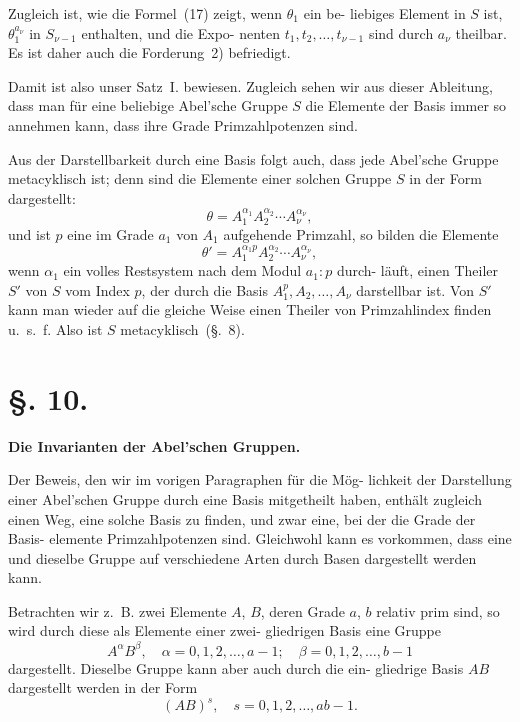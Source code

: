 \documentclass[12pt,a4paper]{article}
\theoremstyle{plain}
\theoremstyle{definition}
\theoremstyle{remark}
\begin{document}
Zugleich ist, wie die Formel~(17) zeigt, wenn $\theta_1$ ein be-
liebiges Element in $S$ ist, $\theta_1^{a_\nu}$ in $S_{\nu-1}$ enthalten, und die Expo-
nenten $t_1, t_2, \ldots, t_{\nu-1}$ sind durch $a_\nu$ theilbar. Es ist daher auch
die Forderung~2) befriedigt.

Damit ist also unser Satz~I. bewiesen. Zugleich sehen wir
aus dieser Ableitung, dass man für eine beliebige Abel'sche
Gruppe $S$ die Elemente der Basis immer so annehmen
kann, dass ihre Grade Primzahlpotenzen sind.

Aus der Darstellbarkeit durch eine Basis folgt auch, dass
jede Abel'sche Gruppe metacyklisch ist; denn sind die Elemente
einer solchen Gruppe $S$ in der Form dargestellt:
\[
\theta = A_1^{\alpha_1} A_2^{\alpha_2} \cdots A_\nu^{\alpha_\nu},
\]
und ist $p$ eine im Grade $a_1$ von $A_1$ aufgehende Primzahl, so
bilden die Elemente
\[
\theta' = A_1^{\alpha_1 p} A_2^{\alpha_2} \cdots A_\nu^{\alpha_\nu},
\]
wenn $\alpha_1$ ein volles Restsystem nach dem Modul $a_1 : p$ durch-
läuft, einen Theiler $S'$ von $S$ vom Index $p$, der durch die Basis
$A_1^p, A_2, \ldots, A_\nu$ darstellbar ist. Von $S'$ kann man wieder auf die
gleiche Weise einen Theiler von Primzahlindex finden u.~s.~f.
Also ist $S$ metacyklisch~(\S.~8).


\section*{\S. 10.}
\begin{center}
\textbf{Die Invarianten der Abel'schen Gruppen.}
\end{center}

Der Beweis, den wir im vorigen Paragraphen für die Mög-
lichkeit der Darstellung einer Abel'schen Gruppe durch eine
Basis mitgetheilt haben, enthält zugleich einen Weg, eine solche
Basis zu finden, und zwar eine, bei der die Grade der Basis-
elemente Primzahlpotenzen sind. Gleichwohl kann es vorkommen,
dass eine und dieselbe Gruppe auf verschiedene Arten durch
Basen dargestellt werden kann.

Betrachten wir z.~B. zwei Elemente $A$, $B$, deren Grade $a$, $b$
relativ prim sind, so wird durch diese als Elemente einer zwei-
gliedrigen Basis eine Gruppe
\begin{equation}\tag{1}
A^\alpha B^\beta, \quad \alpha = 0, 1, 2, \ldots, a-1; \quad \beta = 0, 1, 2, \ldots, b-1
\end{equation}
dargestellt. Dieselbe Gruppe kann aber auch durch die ein-
gliedrige Basis $AB$ dargestellt werden in der Form
\begin{equation}\tag{2}
(AB)^s, \quad s = 0, 1, 2, \ldots, ab-1.
\end{equation}
\end{document}
